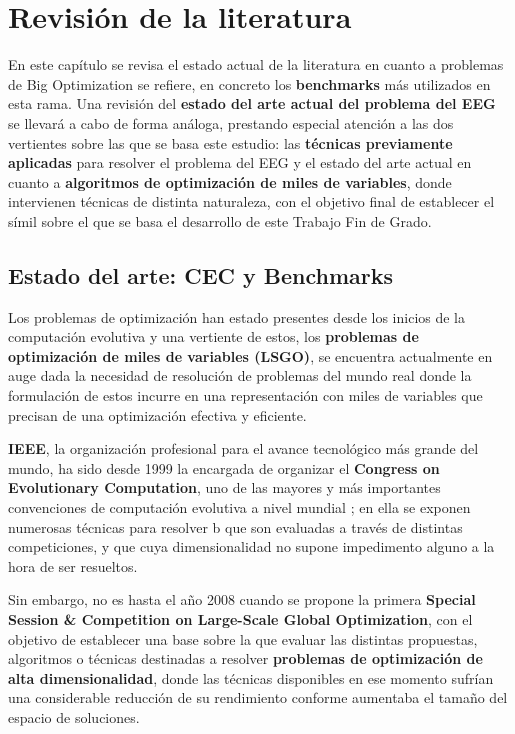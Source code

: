 \chapter{Revisión de la literatura}\label{EstadoArte}

En este capítulo se revisa el estado actual de la literatura en cuanto a problemas de Big Optimization se refiere, en concreto los \textbf{benchmarks} más utilizados en esta rama. Una revisión del \textbf{estado del arte actual del problema del EEG} se llevará a cabo de forma análoga, prestando especial atención a las dos vertientes sobre las que se basa este estudio: las \textbf{técnicas previamente aplicadas} para resolver el problema del EEG y el estado del arte actual en cuanto a \textbf{algoritmos de optimización de miles de variables}, donde intervienen técnicas de distinta naturaleza, con el objetivo final de establecer el símil sobre el que se basa el desarrollo de este Trabajo Fin de Grado. 

\section{Estado del arte: CEC y Benchmarks}

Los problemas de optimización  han estado presentes desde los inicios de la computación evolutiva y una vertiente de estos, los \textbf{problemas de optimización de miles de variables (LSGO)}, se encuentra actualmente en auge dada la necesidad de resolución de problemas del mundo real donde la formulación de estos incurre en una representación con miles de variables que precisan de una optimización efectiva y eficiente.

\textbf{IEEE}, la organización profesional para el avance tecnológico más grande del mundo, ha sido desde 1999 la encargada de organizar el \textbf{Congress on Evolutionary Computation}, uno de las mayores y más importantes convenciones de computación evolutiva a nivel mundial \cite{IEEECEC}; en ella se exponen numerosas técnicas para resolver b que son evaluadas a través de distintas competiciones, y que cuya dimensionalidad no supone impedimento alguno a la hora de ser resueltos.

Sin embargo, no es hasta el año 2008 cuando se propone la primera \textbf{Special Session \& Competition on Large-Scale Global Optimization}\cite{CEC-LSGO}, con el objetivo de establecer una base sobre la que evaluar las distintas propuestas, algoritmos o técnicas destinadas a resolver\textbf{ problemas de optimización de alta dimensionalidad}, donde las técnicas disponibles en ese momento sufrían una considerable reducción de su rendimiento conforme aumentaba el tamaño del espacio de soluciones.

